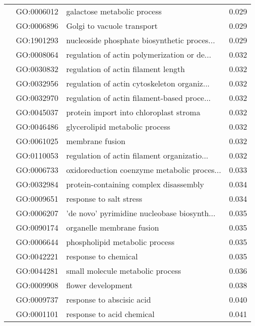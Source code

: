 \begin{longtable}{lllr}
   & GO:0006012 &                  galactose metabolic process &         0.029 \\
   & GO:0006896 &                   Golgi to vacuole transport &         0.029 \\
   & GO:1901293 &  nucleoside phosphate biosynthetic proces... &         0.029 \\
   & GO:0008064 &  regulation of actin polymerization or de... &         0.032 \\
   & GO:0030832 &          regulation of actin filament length &         0.032 \\
   & GO:0032956 &  regulation of actin cytoskeleton organiz... &         0.032 \\
   & GO:0032970 &  regulation of actin filament-based proce... &         0.032 \\
   & GO:0045037 &       protein import into chloroplast stroma &         0.032 \\
   & GO:0046486 &               glycerolipid metabolic process &         0.032 \\
   & GO:0061025 &                              membrane fusion &         0.032 \\
   & GO:0110053 &  regulation of actin filament organizatio... &         0.032 \\
   & GO:0006733 &  oxidoreduction coenzyme metabolic proces... &         0.033 \\
   & GO:0032984 &       protein-containing complex disassembly &         0.034 \\
   & GO:0009651 &                      response to salt stress &         0.034 \\
   & GO:0006207 &  'de novo' pyrimidine nucleobase biosynth... &         0.035 \\
   & GO:0090174 &                    organelle membrane fusion &         0.035 \\
   & GO:0006644 &               phospholipid metabolic process &         0.035 \\
   & GO:0042221 &                         response to chemical &         0.035 \\
   & GO:0044281 &             small molecule metabolic process &         0.036 \\
   & GO:0009908 &                           flower development &         0.038 \\
   & GO:0009737 &                    response to abscisic acid &         0.040 \\
   & GO:0001101 &                    response to acid chemical &         0.041 \\

\end{longtable}
